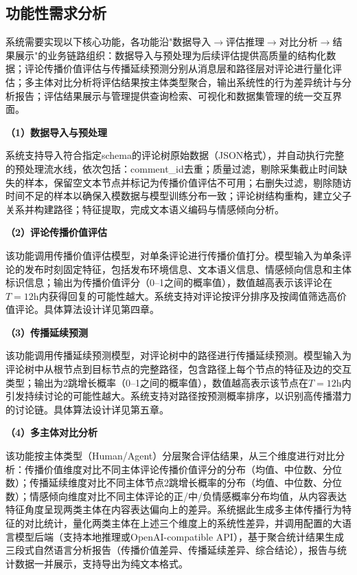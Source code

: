 \subsection{功能性需求分析}

系统需要实现以下核心功能，各功能沿"数据导入$\to$评估推理$\to$对比分析$\to$结果展示"的业务链路组织：数据导入与预处理为后续评估提供高质量的结构化数据；评论传播价值评估与传播延续预测分别从消息层和路径层对评论进行量化评估；多主体对比分析将评估结果按主体类型聚合，输出系统性的行为差异统计与分析报告；评估结果展示与管理提供查询检索、可视化和数据集管理的统一交互界面。

\textbf{（1）数据导入与预处理}

系统支持导入符合指定schema的评论树原始数据（JSON格式），并自动执行完整的预处理流水线，依次包括：comment\_id去重；质量过滤，剔除采集截止时间缺失的样本，保留空文本节点并标记为传播价值评估不可用；右删失过滤，剔除随访时间不足的样本以确保入模数据与模型训练分布一致；评论树结构重构，建立父子关系并构建路径；特征提取，完成文本语义编码与情感倾向分析。

\textbf{（2）评论传播价值评估}

该功能调用传播价值评估模型，对单条评论进行传播价值打分。模型输入为单条评论的发布时刻固定特征，包括发布环境信息、文本语义信息、情感倾向信息和主体标识信息；输出为传播价值评分（0--1之间的概率值），数值越高表示该评论在$T=12\text{h}$内获得回复的可能性越大。系统支持对评论按评分排序及按阈值筛选高价值评论。具体算法设计详见第四章。

\textbf{（3）传播延续预测}

该功能调用传播延续预测模型，对评论树中的路径进行传播延续预测。模型输入为评论树中从根节点到目标节点的完整路径，包含路径上每个节点的特征及边的交互类型；输出为2跳增长概率（0--1之间的概率值），数值越高表示该节点在$T=12\text{h}$内引发持续讨论的可能性越大。系统支持对路径按预测概率排序，以识别高传播潜力的讨论链。具体算法设计详见第五章。

\textbf{（4）多主体对比分析}

该功能按主体类型（Human/Agent）分层聚合评估结果，从三个维度进行对比分析：传播价值维度对比不同主体评论传播价值评分的分布（均值、中位数、分位数）；传播延续维度对比不同主体节点2跳增长概率的分布（均值、中位数、分位数）；情感倾向维度对比不同主体评论的正/中/负情感概率分布均值，从内容表达特征角度呈现两类主体在内容表达偏向上的差异。系统据此生成多主体传播行为特征的对比统计，量化两类主体在上述三个维度上的系统性差异，并调用配置的大语言模型后端（支持本地推理或OpenAI-compatible API），基于聚合统计结果生成三段式自然语言分析报告（传播价值差异、传播延续差异、综合结论），报告与统计数据一并展示，支持导出为纯文本格式。

